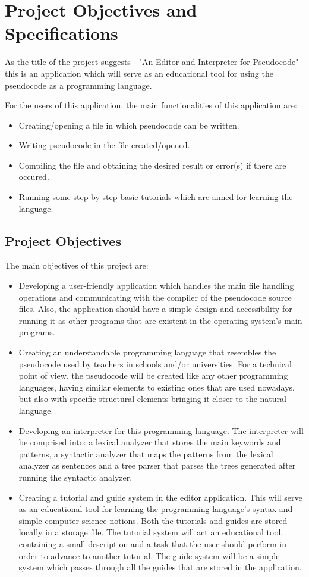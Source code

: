 \documentclass[12pt,a4paper,twoside]{report}
\begin{document}
\chapter{Project Objectives and Specifications}


As the title of the project suggests - "An Editor and Interpreter for Pseudocode" - this is an application which will serve as an educational tool for using the pseudocode as a programming language.

For the users of this application, the main functionalities of this application are:
\begin{itemize}
	\item Creating/opening a file in which pseudocode can be written.
	\item Writing pseudocode in the file created/opened.
	\item Compiling the file and obtaining the desired result or error(s) if there are occured.
	\item Running some step-by-step basic tutorials which are aimed for learning the language.
\end{itemize}

\section{Project Objectives}

The main objectives of this project are:
\begin{itemize}
	\item Developing a user-friendly application which handles the main file handling operations and communicating with the compiler of the pseudocode source files. Also, the application should have a simple design and accessibility for running it as other programs that are existent in the operating system's main programs.
	\item Creating an understandable programming language that resembles the pseudocode used by teachers in schools and/or universities. For a technical point of view, the pseudocode will be created like any other programming languages, having similar elements to existing ones that are used nowadays, but also with specific structural elements bringing it closer to the natural language.
	\item Developing an interpreter for this programming language. The interpreter will be comprised into: a lexical analyzer that stores the main keywords and patterns, a syntactic analyzer that maps the patterns from the lexical analyzer as sentences and a tree parser that parses the trees generated after running the syntactic analyzer.
	\item Creating a tutorial and guide system in the editor application. This will serve as an educational tool for learning the programming language's syntax and simple computer science notions. Both the tutorials and guides are stored locally in a storage file. The tutorial system will act an educational tool, containing a small description and a task that the user should perform in order to advance to another tutorial. The guide system will be a simple system which passes through all the guides that are stored in the application. 
	
\end{itemize}
\end{document}
